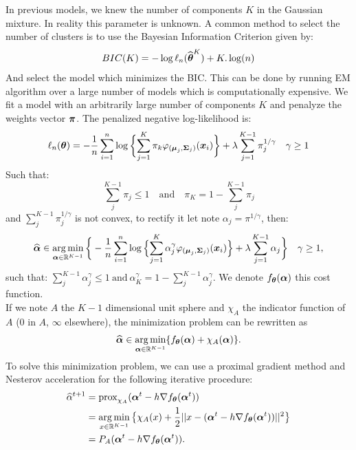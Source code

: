 In previous models, we knew the number of components $K$ in the Gaussian mixture. In reality this parameter is unknown. A common method to select the number of clusters is to use the Bayesian Information Criterion given by:
\begin{equation}
  BIC(K) = -\log\ell_n(\widehat{{\boldsymbol\theta}}^K)+K.\log(n)
\end{equation}
And select the model which minimizes the BIC. This can be done by running EM algorithm over a large number of models which is computationally expensive. We fit a model with an arbitrarily large number of components $K$ and penalyze the weights vector $\boldsymbol \pi$. The penalized negative log-likelihood is:
\begin{equation}
  \ell_n({\boldsymbol\theta})=
-\frac{1}{n}\sum_{i=1}^{n}\log\bigg\{{\sum_{j=1}^K\pi_k\varphi_{(\boldsymbol\mu_{j},\boldsymbol\Sigma_{j})}(\boldsymbol x_i)}\bigg\}+\lambda\sum_{j=1}^{K-1}\pi_j^{1/\gamma}\quad \gamma\geq1
\end{equation}
Such that:
\begin{equation}
  \sum_{j}^{K-1}\pi_j \leq 1 \quad \text{and} \quad \pi_{K}=1-\sum_{j}^{K-1}\pi_j
\end{equation}
and $\sum_{j}^{K-1}\pi_j^{1/\gamma}$ is not convex, to rectify it let note $\alpha_j = \pi^{1/\gamma}$, then:
\begin{equation}
\widehat{\boldsymbol \alpha}\in\operatorname*{arg\,min}_{\boldsymbol \alpha\in {\mathbb R}^{K-1}}\bigg\{
-\frac{1}{n}\sum_{i=1}^{n}\log\Big\{{\sum_{j=1}^K\alpha^\gamma_j\varphi_{(\boldsymbol\mu_{j},\boldsymbol\Sigma_{j})}(\boldsymbol x_i)}\Big\}+\lambda\sum_{j=1}^{K-1}\alpha_j \color{black} \bigg\}\quad \gamma\geq1,  
\end{equation}
such that: $\sum_{j}^{K-1}\alpha_j^\gamma \leq 1\ \text{and}\ \alpha^\gamma_{K}=1-\sum_{j}^{K-1}\alpha_j^\gamma$. We denote $f_{\boldsymbol\theta}(\boldsymbol \alpha)$ \color{black} this cost function.\\
If we note $A$ the $K-1$ dimensional unit sphere and {\large$\chi_A$} the indicator function of $A$ ($0$ in $A$, $\infty$ elsewhere), the minimization problem can be rewritten as
\begin{equation}
  \widehat{\boldsymbol \alpha}\in\operatorname*{arg\,min}_{\boldsymbol \alpha\in{\mathbb R}^{K-1}}\{ f_{\boldsymbol\theta}(\boldsymbol \alpha) + \chi_A(\boldsymbol \alpha)  \}.
\end{equation}
To solve this minimization problem, we can use a proximal gradient method and Nesterov acceleration for the following iterative procedure:
\begin{align}
\widehat\alpha^{t+1}
&={\text{prox}}_{\chi_A}( \boldsymbol \alpha^t - h \nabla f_{{\boldsymbol\theta}}(\boldsymbol \alpha^t)  )\\
&=\operatorname*{arg\,min}_{x\in{\mathbb R}^{K-1}}\big\{ \chi_A(x) + \frac{1}{2}||x-(\boldsymbol \alpha^t - h \nabla f_{{\boldsymbol\theta}}(\boldsymbol \alpha^t)) ||^2 \big\}\\
&=P_A( \boldsymbol \alpha^t - h \nabla f_{{\boldsymbol\theta}}(\boldsymbol \alpha^t) ).
\end{align}
